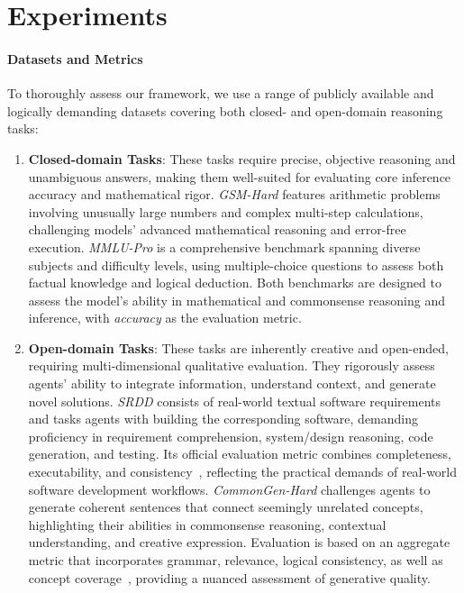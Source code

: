 \documentclass{article}
\begin{document}
\section{Experiments}

\paragraph{Datasets and Metrics}
To thoroughly assess our framework, we use a range of publicly available and logically demanding datasets covering both closed- and open-domain reasoning tasks:

\begin{enumerate}[$\bullet$]
\setlength{\topsep}{0pt}
\setlength{\itemsep}{0pt}
\item \textbf{Closed-domain Tasks}: These tasks require precise, objective reasoning and unambiguous answers, making them well-suited for evaluating core inference accuracy and mathematical rigor.
\emph{GSM-Hard}\cite{gao2023palprogramaidedlanguagemodels} features arithmetic problems involving unusually large numbers and complex multi-step calculations, challenging models’ advanced mathematical reasoning and error-free execution.
\emph{MMLU-Pro}\cite{wang2024mmluprorobustchallengingmultitask} is a comprehensive benchmark spanning diverse subjects and difficulty levels, using multiple-choice questions to assess both factual knowledge and logical deduction. Both benchmarks are designed to assess the model’s ability in mathematical and commonsense reasoning and inference, with \emph{accuracy} as the evaluation metric. 
\item \textbf{Open-domain Tasks}: These tasks are inherently creative and open-ended, requiring multi-dimensional qualitative evaluation. They rigorously assess agents’ ability to integrate information, understand context, and generate novel solutions.
\emph{SRDD}\cite{qian2024chatdevcommunicativeagentssoftware} consists of real-world textual software requirements and tasks agents with building the corresponding software, demanding proficiency in requirement comprehension, system/design reasoning, code generation, and testing. Its official evaluation metric combines completeness, executability, and consistency~\cite{qian2024chatdevcommunicativeagentssoftware}, reflecting the practical demands of real-world software development workflows.
\emph{CommonGen-Hard}\cite{madaan2023selfrefineiterativerefinementselffeedback} challenges agents to generate coherent sentences that connect seemingly unrelated concepts, highlighting their abilities in commonsense reasoning, contextual understanding, and creative expression. Evaluation is based on an aggregate metric that incorporates grammar, relevance, logical consistency\cite{li2018generating}, as well as concept coverage~\cite{madaan2023selfrefineiterativerefinementselffeedback}, providing a nuanced assessment of generative quality.
\end{enumerate}
\end{document}
